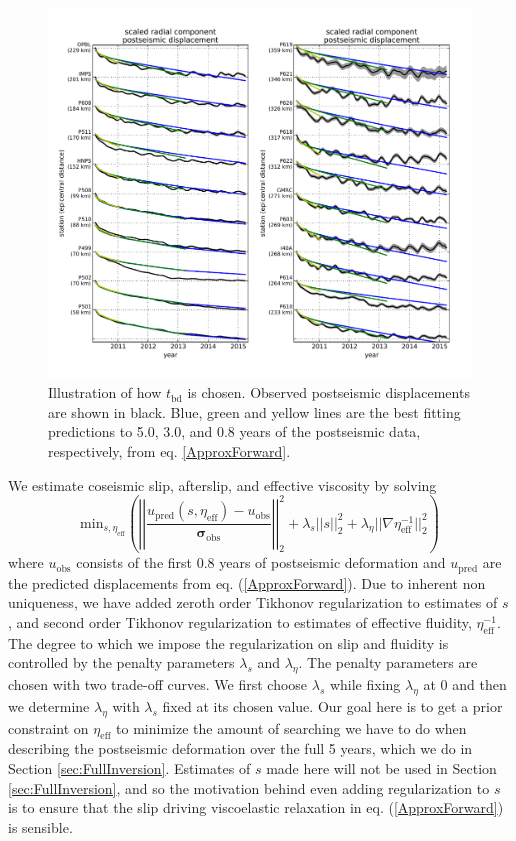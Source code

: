 \documentclass[review]{elsarticle}
\begin{document}
\begin{figure}
\includegraphics[scale=0.7]{Figures/RecordSectionDuration}
\centering 
\caption{Illustration of how $t_\mathrm{bd}$ is chosen. Observed postseismic displacements are shown in black.  Blue, green and yellow lines are the best fitting predictions to 5.0, 3.0, and 0.8 years of the postseismic data, respectively, from eq. \ref{ApproxForward}.}  
\label{fig:RecordSection1}
\end{figure}

We estimate coseismic slip, afterslip, and effective viscosity by solving 
\begin{equation}\label{ObjectiveFunction}
 \mathrm{min}_{s,\eta_\mathrm{eff}} \left(\left|\left|
 \frac{u_\mathrm{pred}(s,\eta_\mathrm{eff}) - u_\mathrm{obs}}
 {\mathbf{\sigma_\mathrm{obs}}}\right|\right|_2^2 + 
 \lambda_s||s||_2^2 + 
 \lambda_\eta||\nabla \eta_{\mathrm{eff}}^{-1}||_2^2\right)
\end{equation} 
where $u_\mathrm{obs}$ consists of the first 0.8 years of postseismic deformation and $u_\mathrm{pred}$ are the predicted displacements from eq. (\ref{ApproxForward}).  Due to inherent non uniqueness, we have added zeroth order Tikhonov regularization to estimates of $s$, and second order Tikhonov regularization to estimates of effective fluidity, $\eta_\mathrm{eff}^{-1}$. The degree to which we impose the regularization on slip and fluidity is controlled by the penalty parameters $\lambda_s$ and $\lambda_\eta$.  The penalty parameters are chosen with two trade-off curves. We first choose $\lambda_s$ while fixing $\lambda_\eta$ at 0 and then we determine $\lambda_\eta$ with $\lambda_s$ fixed at its chosen value. Our goal here is to get a prior constraint on $\eta_{\mathrm{eff}}$ to minimize the amount of searching we have to do when describing the postseismic deformation over the full 5 years, which we do in Section \ref{sec:FullInversion}.  Estimates of $s$ made here will not be used in Section \ref{sec:FullInversion}, and so the motivation behind even adding regularization to $s$ is to ensure that the slip driving viscoelastic relaxation in eq. (\ref{ApproxForward}) is sensible.  
\end{document}
